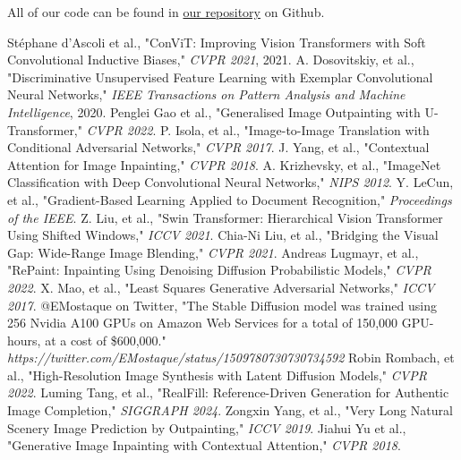 \documentclass[sigconf]{acmart}
\begin{document}
All of our code can be found in \textcolor{red}{\href{https://github.com/yewentao256/CS5787-Final}{our repository}} on Github.

\begin{thebibliography}{9}
     Stéphane d’Ascoli et al., "ConViT: Improving Vision Transformers with Soft Convolutional Inductive Biases," \textit{CVPR 2021}, 2021.
     A. Dosovitskiy, et al., "Discriminative Unsupervised Feature Learning with Exemplar Convolutional Neural Networks," \textit{IEEE Transactions on Pattern Analysis and Machine Intelligence}, 2020.
     Penglei Gao et al., "Generalised Image Outpainting with U-Transformer," \textit{CVPR 2022}.
     P. Isola, et al., "Image-to-Image Translation with Conditional Adversarial Networks," \textit{CVPR 2017}.
     J. Yang, et al., "Contextual Attention for Image Inpainting," \textit{CVPR 2018}.
     A. Krizhevsky, et al., "ImageNet Classification with Deep Convolutional Neural Networks," \textit{NIPS 2012}.
     Y. LeCun, et al., "Gradient-Based Learning Applied to Document Recognition," \textit{Proceedings of the IEEE}.
     Z. Liu, et al., "Swin Transformer: Hierarchical Vision Transformer Using Shifted Windows," \textit{ICCV 2021}.
     Chia-Ni Liu, et al., "Bridging the Visual Gap: Wide-Range Image Blending," \textit{CVPR 2021}.
     Andreas Lugmayr, et al., "RePaint: Inpainting Using Denoising Diffusion Probabilistic Models," \textit{CVPR 2022}.
     X. Mao, et al., "Least Squares Generative Adversarial Networks," \textit{ICCV 2017}.
     @EMostaque on Twitter, "The Stable Diffusion model was trained using 256 Nvidia A100 GPUs on Amazon Web Services for a total of 150,000 GPU-hours, at a cost of \$600,000." \textit{https://twitter.com/EMostaque/status/1509780730730734592}
     Robin Rombach, et al., "High-Resolution Image Synthesis with Latent Diffusion Models," \textit{CVPR 2022}.
     Luming Tang, et al., "RealFill: Reference-Driven Generation for Authentic Image Completion," \textit{SIGGRAPH 2024}.
     Zongxin Yang, et al., "Very Long Natural Scenery Image Prediction by Outpainting," \textit{ICCV 2019}.
     Jiahui Yu et al., "Generative Image Inpainting with Contextual Attention," \textit{CVPR 2018}.
\end{thebibliography}
\end{document}
